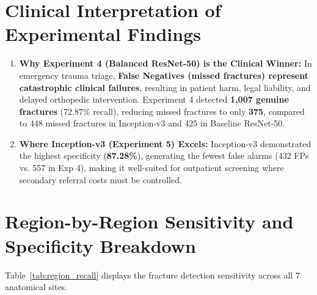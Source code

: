 \documentclass[12pt, a4paper]{report}
\begin{document}
\section{Clinical Interpretation of Experimental Findings}
\begin{enumerate}[leftmargin=*]
    \item \textbf{Why Experiment 4 (Balanced ResNet-50) is the Clinical Winner:} In emergency trauma triage, \textbf{False Negatives (missed fractures) represent catastrophic clinical failures}, resulting in patient harm, legal liability, and delayed orthopedic intervention. Experiment 4 detected \textbf{1,007 genuine fractures} (72.87\% recall), reducing missed fractures to only \textbf{375}, compared to 448 missed fractures in Inception-v3 and 425 in Baseline ResNet-50.
    \item \textbf{Where Inception-v3 (Experiment 5) Excels:} Inception-v3 demonstrated the highest specificity (\textbf{87.28\%}), generating the fewest false alarms (432 FPs vs. 557 in Exp 4), making it well-suited for outpatient screening where secondary referral costs must be controlled.
\end{enumerate}

\section{Region-by-Region Sensitivity and Specificity Breakdown}
Table~\ref{tab:region_recall} displays the fracture detection sensitivity across all 7 anatomical sites.
\end{document}
